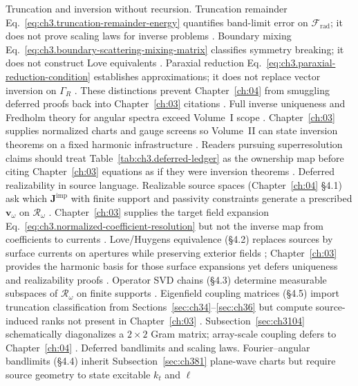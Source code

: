 Truncation and inversion without recursion. Truncation remainder Eq.~\eqref{eq:ch3.truncation-remainder-energy} quantifies band-limit error on \(\mathcal{F}_{\mathrm{rad}}\); it does not
prove scaling laws for inverse problems \cite{kato1995}. Boundary mixing Eq.~\eqref{eq:ch3.boundary-scattering-mixing-matrix}
classifies symmetry breaking; it does not construct Love equivalents \cite{jackson1999}. Paraxial reduction
Eq.~\eqref{eq:ch3.paraxial-reduction-condition} establishes approximations; it does not replace vector inversion on \(\Gamma_R\)
\cite{allen1992}. These distinctions prevent Chapter~\ref{ch:04} from smuggling deferred proofs back into
Chapter~\ref{ch:03} citations \cite{stratton1941}.
Full inverse uniqueness and Fredholm theory for angular spectra exceed Volume~I scope \cite{devaney2004}. Chapter~\ref{ch:03} supplies
normalized charts and gauge screens so Volume~II can state inversion theorems on a fixed harmonic infrastructure \cite{hansen1988}.
Readers pursuing superresolution claims should treat Table~\ref{tab:ch3.deferred-ledger} as the ownership map before citing Chapter~\ref{ch:03}
equations as if they were inversion theorems \cite{harrington2001}.
Deferred realizability in source language. Realizable source spaces (Chapter~\ref{ch:04} §4.1) ask which \(\mathbf{J}^{\mathrm{imp}}\) with finite support and passivity constraints generate a
prescribed \(\mathbf{v}_\omega\) on \(\mathcal{R}_\omega\) \cite{stratton1941}. Chapter~\ref{ch:03} supplies the target
field expansion Eq.~\eqref{eq:ch3.normalized-coefficient-resolution} but not the inverse map from coefficients to currents \cite{harrington2001}.
Love/Huygens equivalence (§4.2) replaces sources by surface currents on apertures while preserving exterior fields \cite{stratton1941};
Chapter~\ref{ch:03} provides the harmonic basis for those surface expansions yet defers uniqueness and realizability proofs \cite{devaney2004}.
Operator SVD chains (§4.3) determine measurable subspaces of \(\mathcal{R}_\omega\) on finite supports \cite{devaney2004}. Eigenfield coupling
matrices (§4.5) import truncation classification from Sections~\ref{sec:ch34}--\ref{sec:ch36} but compute source-induced ranks not present in Chapter~\ref{ch:03}
\cite{harrington2001}. Subsection~\ref{sec:ch3104} schematically diagonalizes a \(2\times2\) Gram matrix; array-scale coupling defers to
Chapter~\ref{ch:04} \cite{jackson1999}.
Deferred bandlimits and scaling laws. Fourier--angular bandlimits (§4.4) inherit Subsection~\ref{sec:ch381} plane-wave charts but require source geometry to state excitable \(k_{t}\) and \(\ell\)
